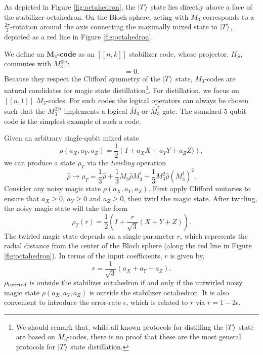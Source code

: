 \documentclass[11pt]{article}
\def\ket#1{\mathinner{|{#1}\rangle}}
\begin{document}
As depicted in Figure \ref{fig:octahedron}, the $\ket{T}$ state lies directly above a face of the stabilizer octahedron. On the Bloch sphere, acting with $M_3$ corresponds to a $\frac{2\pi}{3}$-rotation around the axis connecting the maximally mixed state to $\ket{T}$, depicted as a red line in Figure \ref{fig:octahedron}. 

We define an \textbf{$\mathbf{M}_3$-code} as an $[[n,k]]$ stabilizer code, whose projector, $\Pi_S$, commutes with $M_3^{\otimes n}$: \begin{equation}
    [M_3^{\otimes n}, \Pi_S]=0. \label{M3-condition}
\end{equation} 
Because they respect the Clifford symmetry of the $\ket{T}$ state, $M_3$-codes are natural candidates for magic state distillation\footnote{We should remark that, while all known protocols for distilling the $\ket{T}$ state are based on $M_3$-codes, there is no proof that these are the most general protocols for $\ket{T}$ state distillation.}. 
 For distillation, we focus on $[[n,1]]$ $M_3$-codes. 
For such codes the logical operators can always be chosen such that the $M_3^{\otimes n}$ implements a logical $\overline{M}_3$ or $\overline{M}_3^\dagger$ gate. 
The standard 5-qubit code \cite{MSD} is the simplest example of such a code.

Given an arbitrary single-qubit mixed state \begin{equation}
\rho(a_X, a_Y, a_Z)= \frac{1}{2}\left( I + a_X X+ a_Y Y+a_Z Z) \right),
\end{equation} we can produce a state $\rho_{T}$ via the \textit{twirling} operation
\begin{equation}
    \hat \rho \to \rho_{T}= \frac{1}{3} \hat \rho + \frac{1}{3} M_3 \hat \rho M_3^\dagger + \frac{1}{3} M_3^2 \hat \rho (M_3^{\dagger})^2.
\end{equation} 
Consider any noisy magic state $\rho(a_X,a_Y,a_Z)$. First apply Clifford unitaries to ensure that $a_X\geq0$, $a_Y\geq0$ and $a_Z\geq0$, then twirl the magic state. After twirling, the noisy magic state will take the form
\begin{equation}
\rho_{T}(r)= \frac{1}{2}\left( I + \frac{r}{\sqrt{3}}(X+Y+Z) \right). \label{twirled-state}
\end{equation}
The twirled magic state depends on a single parameter $r$, which represents the radial distance from the center of the Bloch sphere (along the red line in Figure \ref{fig:octahedron}). In terms of the input coefficients, $r$ is given by,
\begin{equation}
    r=\frac{1}{\sqrt{3}}(a_X+a_Y+a_Z).
\end{equation}
$\rho_{\rm twirled}$ is outside the stabilizer octahedron if and only if the untwirled noisy magic state $\rho(a_X,a_Y,a_Z)$ is outside the stabilizer octahedron. It is also convenient to introduce the error-rate $\epsilon$, which is related to $r$ via $r=1-2\epsilon$. 
\end{document}
